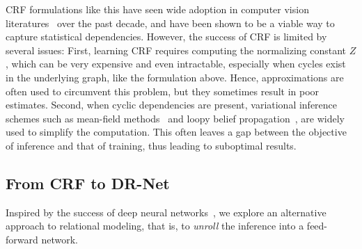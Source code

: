 \documentclass[10pt,twocolumn,letterpaper]{article}
\begin{document}
CRF formulations like this have seen wide adoption in computer vision literatures~\cite{zheng2015conditional, quattoni2004conditional}
over the past decade, and have been shown to be a viable way to capture statistical dependencies.
However, the success of CRF is limited by several issues:
% 
First, learning CRF requires computing the normalizing constant $Z$, 
which can be very expensive and even intractable, especially when 
cycles exist in the underlying graph, like the formulation above. 
Hence, approximations are often used to circumvent this problem, 
but they sometimes result in poor estimates.
%
Second, when cyclic dependencies are present, 
variational inference schemes 
such as mean-field methods~\cite{koltun2011efficient} and loopy belief propagation~\cite{pearl1988probabilistic},
are widely used to simplify the computation.
This often leaves a gap between the objective of inference and
that of training, thus leading to suboptimal results. 

\subsection{From CRF to DR-Net}%

Inspired by the success of deep neural networks~\cite{he2015deep, Simonyan14c}, 
we explore an alternative approach to relational modeling, 
that is, to \emph{unroll} the inference into a feed-forward network.
\end{document}

